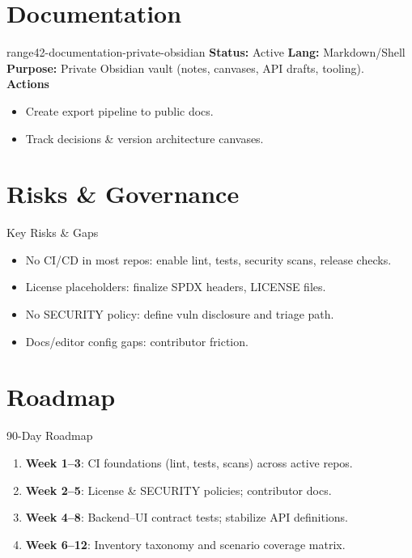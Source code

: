 \documentclass[aspectratio=169]{beamer}
\begin{document}
\section{Documentation}

\begin{frame}{range42-documentation-private-obsidian \; \faBook}
  \textbf{Status:} Active \hfill \textbf{Lang:} Markdown/Shell\\[2mm]
  \textbf{Purpose:} Private Obsidian vault (notes, canvases, API drafts, tooling).\\[2mm]
  \textbf{Actions}
  \begin{itemize}
    \item Create export pipeline to public docs.
    \item Track decisions \& version architecture canvases.
  \end{itemize}
\end{frame}

\section{Risks \& Governance}

\begin{frame}{Key Risks \& Gaps \; \faExclamationTriangle}
  \begin{itemize}
    \item \alert{No CI/CD in most repos}: enable lint, tests, security scans, release checks.
    \item \alert{License placeholders}: finalize SPDX headers, LICENSE files.
    \item \alert{No SECURITY policy}: define vuln disclosure and triage path.
    \item Docs/editor config gaps: contributor friction.
  \end{itemize}
\end{frame}

\section{Roadmap}

\begin{frame}{90-Day Roadmap \; \faRoad}
  \begin{enumerate}
    \item \textbf{Week 1–3}: CI foundations (lint, tests, scans) across active repos.
    \item \textbf{Week 2–5}: License \& SECURITY policies; contributor docs.
    \item \textbf{Week 4–8}: Backend–UI contract tests; stabilize API definitions.
    \item \textbf{Week 6–12}: Inventory taxonomy and scenario coverage matrix.
  \end{enumerate}
\end{frame}
\end{document}

